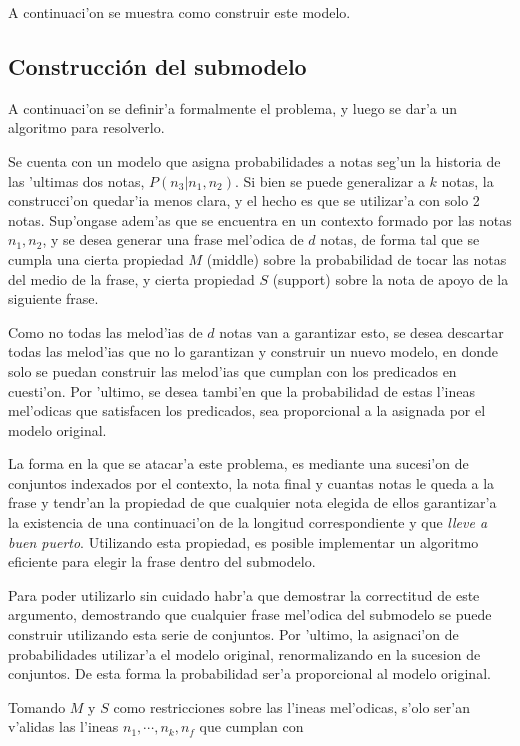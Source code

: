 A continuaci'on se muestra como construir este modelo. 


\subsection{Construcci\'on del submodelo}
\label{sec:phrase_model}
A continuaci'on se definir'a formalmente el problema, y luego se dar'a un algoritmo para resolverlo.

Se cuenta con un modelo que asigna probabilidades a notas seg'un la historia de las 'ultimas dos notas, $P(n_3 | n_1, n_2)$. Si bien se puede generalizar a $k$ notas,
la construcci'on quedar'ia menos clara, y el hecho es que se utilizar'a con solo 2 notas. Sup'ongase adem'as que se encuentra en un contexto formado por las notas 
$n_1, n_2$, y se desea generar una frase mel'odica de $d$ notas, de forma tal que se cumpla una cierta propiedad $M$ (middle) sobre la probabilidad de tocar las notas
del medio de la frase, y cierta propiedad $S$ (support) sobre la nota de apoyo de la siguiente frase.

Como no todas las melod'ias de $d$ notas van a garantizar esto, se desea descartar todas las melod'ias que no lo garantizan y construir un nuevo modelo, en donde
solo se puedan construir las melod'ias que cumplan con los predicados en cuesti'on. Por 'ultimo, se desea tambi'en que la probabilidad de estas l'ineas mel'odicas 
que satisfacen los predicados, sea proporcional a la asignada por el modelo original. 

La forma en la que se atacar'a este problema, es mediante una sucesi'on de conjuntos indexados por el contexto, la nota final y cuantas notas le queda
a la frase y tendr'an la propiedad de que cualquier nota elegida de ellos garantizar'a la existencia de una continuaci'on de la longitud correspondiente 
 y que \emph{lleve a buen puerto}. Utilizando esta propiedad, es posible implementar un algoritmo eficiente para elegir la frase dentro del submodelo. 

Para poder utilizarlo sin cuidado habr'a que demostrar la correctitud de este argumento, demostrando que cualquier frase mel'odica del submodelo se puede construir
utilizando esta serie de conjuntos. Por 'ultimo, la asignaci'on de probabilidades utilizar'a el modelo original, renormalizando en la sucesion de conjuntos. De esta 
forma la probabilidad ser'a proporcional al modelo original.

Tomando $M$ y $S$ como restricciones sobre las l'ineas mel'odicas, s'olo ser'an v'alidas las l'ineas $n_1, \cdots, n_k, n_f$ que cumplan con

